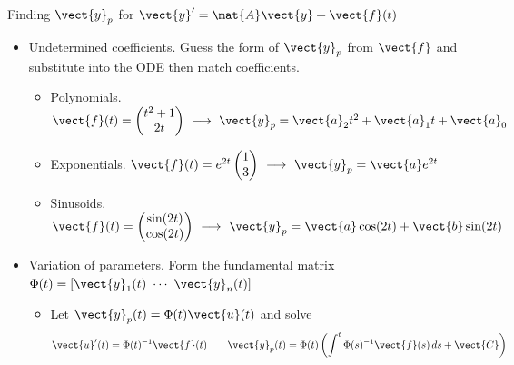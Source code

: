 \documentclass[11pt,aspectratio=169]{beamer}
\begin{document}
\begin{frame}{Finding $\vect{y}_p$ for $\vect{y}'=\mat{A}\vect{y}+\vect{f}(t)$}
\begin{itemize}
\item Undetermined coefficients. Guess the form of $\vect{y}_p$ from
$\vect{f}$ and substitute into the ODE then match coefficients. 
\begin{itemize}
\item Polynomials. $\vect{f}(t)=\begin{pmatrix}t^2+1\\2t\end{pmatrix}\ \longrightarrow\ \vect{y}_p=\vect{a}_2t^2+\vect{a}_1t+\vect{a}_0$
\item Exponentials. $\vect{f}(t)=e^{2t}\begin{pmatrix}1\\3\end{pmatrix}\ \longrightarrow\ \vect{y}_p=\vect{a}e^{2t}$
\item Sinusoids. $\vect{f}(t)=\begin{pmatrix}\sin(2t)\\\cos(2t)\end{pmatrix}\ \longrightarrow\ \vect{y}_p=\vect{a}\cos(2t)+\vect{b}\sin(2t)$
\end{itemize}
\item Variation of parameters. Form the fundamental matrix 
$
\Phi(t)=\left[\vect{y}_1(t)\ \cdots\ \vect{y}_n(t)\right]
$
\begin{itemize}
\item Let $\vect{y}_p(t)=\Phi(t)\vect{u}(t)$ and solve
\[
\vect{u}'(t)=\Phi(t)^{-1}\vect{f}(t)
\qquad
\vect{y}_p(t)=\Phi(t)\left(\int_{}^{t}\Phi(s)^{-1}\vect{f}(s)\,ds+\vect{C}\right)
\]
\end{itemize}
\end{itemize}
\end{frame}
\end{document}
